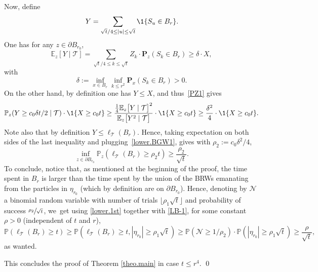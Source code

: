 Now, define
\begin{equation*}%
Y= \sum_{\sqrt t/4\le |u|\le \sqrt t} \1\{S_u \in B_r\}.
\end{equation*}
One has for any $z\in \partial B_{r_0}$,
\[
\mathbb E_z[Y\mid \mathbf {\mathcal T}] =
\sum_{\sqrt t/4\le k\le\sqrt t} Z_k \cdot \mathbf P_z(S_k \in B_r)
\ge \delta\cdot X,
\]
with
\begin{equation*}
\delta:=\inf_{x\in B_r}\inf_{k\le r^2} \mathbf P_x(S_k\in B_r)>0.
\end{equation*}
On the other hand, by definition one has
$Y \le X$, and thus~\eqref{PZ1}
gives
\[
\mathbb P_z(Y \ge c_0\delta t/2 \mid \mathbf {\mathcal T})
\cdot \1\{X\ge c_0t\}
\ge \frac{\frac{1}{4}\mathbb E_z\big[ Y\mid \mathbf {\mathcal T}\big]^2}
{\mathbb E_z\big[Y^2\mid \mathbf {\mathcal T}\big]}\cdot \1\{X\ge c_0t \}
\ge \frac{\delta^2}{4}\cdot \1\{X\ge c_0t\}.
\]
Note also that by definition $Y\le \ell_{\mathcal T}(B_r)$. Hence, taking expectation on
both sides of the last inequality and plugging~\eqref{lower.BGW1}, gives with $\rho_2:= c_0\delta^2/4$,
\begin{equation}\label{LB-1}
\inf_{z\in \partial B_{r_0}} \mathbb P_z(\ell_{\mathcal T}(B_r)\ge \rho_2 t) \ge \frac{\rho_2}{\sqrt t}.
\end{equation}
To conclude, notice that, as mentioned at the beginning of the proof, the time spent in $B_r$ is larger than the time spent by
the union of the BRWs emanating from the particles in $\eta_{r_0}$ (which by definition are on $\partial B_{r_0}$).
Hence, denoting by $\mathcal N$ a binomial random variable with number of trials $\lfloor \rho_1\sqrt t\rfloor $ and probability of success $\sfrac{\rho_2}{\sqrt t}$, we~get using \eqref{lower.1st} together with \eqref{LB-1},
for some constant $\rho>0$ (independent of $t$ and $r$),
\[
\mathbb P(\ell_{\mathcal T}(B_r) \ge t) \ge\mathbb P(\ell_{\mathcal T}(B_r) \ge t, |\eta_{r_0}|\ge \rho_1\sqrt t) \ge \mathbb P(\mathcal N\ge 1/\rho_2)\cdot \mathbb P(|\eta_{r_0}|\ge \rho_1\sqrt t) \ge \frac{\rho}{\sqrt t},
\]
as wanted.

This concludes the proof of Theorem \ref{theo.main} in case $t\le r^4$. \qed


